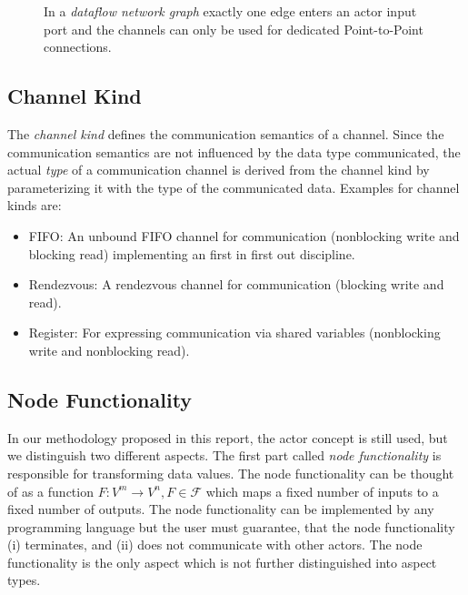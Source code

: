 \begin{figure}
\centering

\caption{\label{ng-dataflow} In a \emph{dataflow network graph} exactly
  one edge enters an actor input port and
  the channels can only be used for dedicated
  Point-to-Point connections.}
\end{figure}

\subsection{Channel Kind}\label{channel-kind}

The \emph{channel kind} defines the communication semantics of a channel.
Since the communication semantics are not influenced by the
data type communicated, the actual \emph{type} of a communication
channel is derived from the channel kind by parameterizing it with
the type of the communicated data. Examples for channel kinds are:

\begin{itemize}
\item \label{channel-kind-fifo} FIFO:
  An unbound FIFO channel for communication
  (nonblocking write and blocking read) implementing
  an first in first out discipline.

\item \label{channel-kind-rendezvous} Rendezvous:
  A rendezvous channel for communication %
  (blocking write and read).

\item \label{channel-kind-register} Register:
  For expressing communication via shared variables
  (nonblocking write and nonblocking read).
\end{itemize}

\subsection{Node Functionality}\label{node-functionality}

In our methodology proposed in this report, the actor concept is still used,
but we distinguish two different aspects.
The first part called \emph{node functionality} is responsible
for transforming data values. The node functionality can be
thought of as a function $F: V^{m} \to V^{n}, F \in \mathcal{F}$  which maps a fixed
number of inputs to a fixed number of outputs. The node functionality
can be implemented by any programming language but
the user must guarantee, that the node functionality (i) terminates,
and (ii) does not communicate with other actors.
The node functionality is the only aspect which is not
further distinguished into aspect types.

